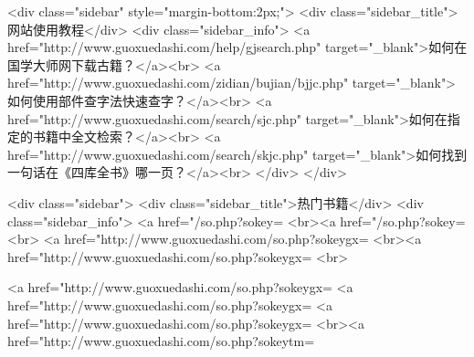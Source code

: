<div class="sidebar"  style="margin-bottom:2px;">
<div class="sidebar_title">网站使用教程</div>
<div class="sidebar_info">
<a href="http://www.guoxuedashi.com/help/gjsearch.php" target="_blank">如何在国学大师网下载古籍？</a><br>
<a href="http://www.guoxuedashi.com/zidian/bujian/bjjc.php" target="_blank">如何使用部件查字法快速查字？</a><br>
<a href="http://www.guoxuedashi.com/search/sjc.php" target="_blank">如何在指定的书籍中全文检索？</a><br>
<a href="http://www.guoxuedashi.com/search/skjc.php" target="_blank">如何找到一句话在《四库全书》哪一页？</a><br>
</div>
</div>


<div class="sidebar">
<div class="sidebar_title">热门书籍</div>
<div class="sidebar_info">
<a href="/so.php?sokey=%
<br><a href="/so.php?sokey=%
<br>
<a href="http://www.guoxuedashi.com/so.php?sokeygx=%
<br><a href="http://www.guoxuedashi.com/so.php?sokeygx=%
<br>

<a href="http://www.guoxuedashi.com/so.php?sokeygx=%
<a href="http://www.guoxuedashi.com/so.php?sokeygx=%
<a href="http://www.guoxuedashi.com/so.php?sokeygx=%
<br><a href="http://www.guoxuedashi.com/so.php?sokeytm=%

